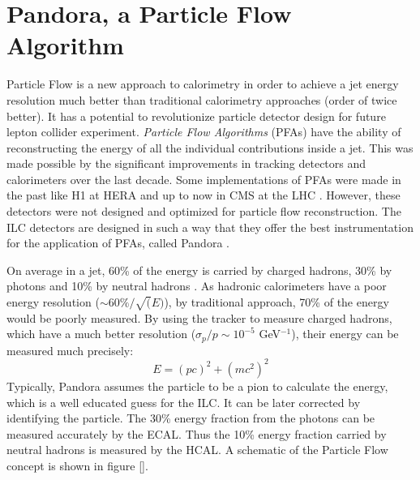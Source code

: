 \section{Pandora, a Particle Flow Algorithm}
\label{sec:PFA}

Particle Flow is a new approach to calorimetry in order to achieve a jet energy resolution much better than traditional calorimetry approaches (order of twice better). It has a potential to revolutionize particle detector design for future lepton collider experiment. \textit{Particle Flow Algorithms} (PFAs) have the ability of reconstructing the energy of all the individual contributions inside a jet. This was made possible by the significant improvements in tracking detectors and calorimeters over the last decade. Some implementations of PFAs were made in the past like H1 at HERA \cite{Abt:1994ye} and up to now in CMS at the LHC \cite{Sirunyan:2017ulk}. However, these detectors were not designed and optimized for particle flow reconstruction. The ILC detectors are designed in such a way that they offer the best instrumentation for the application of PFAs, called Pandora \cite{Marshall2013}.

On average in a jet, 60\% of the energy is carried by charged hadrons, 30\% by photons and 10\% by neutral hadrons \cite{Ebrahimi:394104}. As hadronic calorimeters have a poor energy resolution ($\sim 60\%/\sqrt(E)$), by traditional approach, 70\% of the energy would be poorly measured. By using the tracker to measure charged hadrons, which have a much better resolution ($\sigma_p/p \sim 10^{-5}$ GeV$^{-1}$), their energy can be measured much precisely:
\begin{equation}
  E = (pc)^2 + (mc^2)^2
\end{equation}
Typically, Pandora assumes the particle to be a pion to calculate the energy, which is a well educated guess for the ILC. It can be later corrected by identifying the particle. The 30\% energy fraction from the photons can be measured accurately by the ECAL. Thus the 10\% energy fraction carried by neutral hadrons is measured by the HCAL. A schematic of the Particle Flow concept is shown in figure \ref{}.
